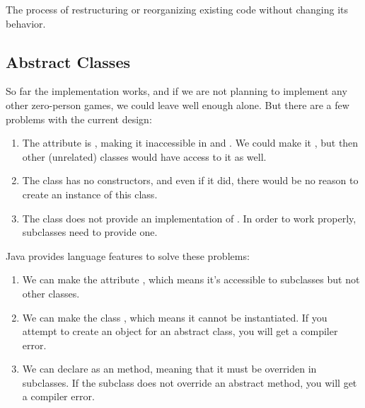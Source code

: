\begin{description}

The process of restructuring or reorganizing existing code without changing its behavior.

\end{description}


\subsection*{Abstract Classes}

So far the implementation works, and if we are not planning to implement any other zero-person games, we could leave well enough alone.
But there are a few problems with the current design:

\begin{enumerate}

\item The  attribute is , making it inaccessible in  and .
We could make it , but then other (unrelated) classes would have access to it as well.

\item The  class has no constructors, and even if it did, there would be no reason to create an instance of this class.

\item The  class does not provide an implementation of .
In order to work properly, subclasses need to provide one.

\end{enumerate}


Java provides language features to solve these problems:

\begin{enumerate}

\item We can make the  attribute , which means it's accessible to subclasses but not other classes.

\item We can make the class , which means it cannot be instantiated.
If you attempt to create an object for an abstract class, you will get a compiler error.

\item We can declare  as an  method, meaning that it must be overriden in subclasses.
If the subclass does not override an abstract method, you will get a compiler error.
\end{enumerate}

